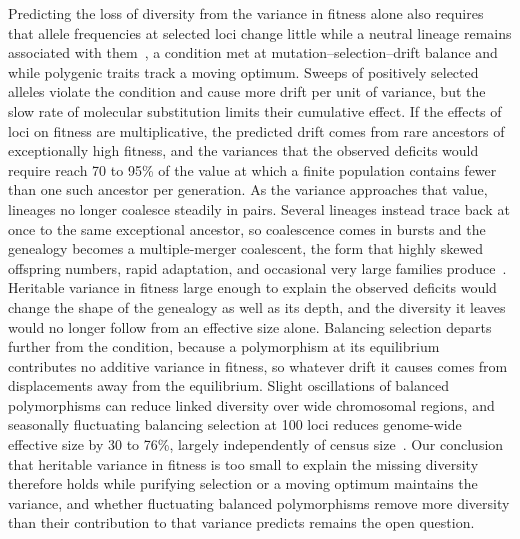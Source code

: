 \documentclass{article}
\begin{document}
Predicting the loss of diversity from the variance in fitness alone also requires that allele frequencies at selected loci change little while a neutral lineage remains associated with them~\cite{barton2000}, a condition met at mutation--selection--drift balance and while polygenic traits track a moving optimum. Sweeps of positively selected alleles violate the condition and cause more drift per unit of variance, but the slow rate of molecular substitution limits their cumulative effect. If the effects of loci on fitness are multiplicative, the predicted drift comes from rare ancestors of exceptionally high fitness, and the variances that the observed deficits would require reach 70 to 95\% of the value at which a finite population contains fewer than one such ancestor per generation. As the variance approaches that value, lineages no longer coalesce steadily in pairs. Several lineages instead trace back at once to the same exceptional ancestor, so coalescence comes in bursts and the genealogy becomes a multiple-merger coalescent, the form that highly skewed offspring numbers, rapid adaptation, and occasional very large families produce~\cite{eldon2006,neher2013,diamantidis2024}. Heritable variance in fitness large enough to explain the observed deficits would change the shape of the genealogy as well as its depth, and the diversity it leaves would no longer follow from an effective size alone. Balancing selection departs further from the condition, because a polymorphism at its equilibrium contributes no additive variance in fitness, so whatever drift it causes comes from displacements away from the equilibrium. Slight oscillations of balanced polymorphisms can reduce linked diversity over wide chromosomal regions, and seasonally fluctuating balancing selection at 100 loci reduces genome-wide effective size by 30 to 76\%, largely independently of census size~\cite{wittmann2023,johnson2026}. Our conclusion that heritable variance in fitness is too small to explain the missing diversity therefore holds while purifying selection or a moving optimum maintains the variance, and whether fluctuating balanced polymorphisms remove more diversity than their contribution to that variance predicts remains the open question.
\end{document}
